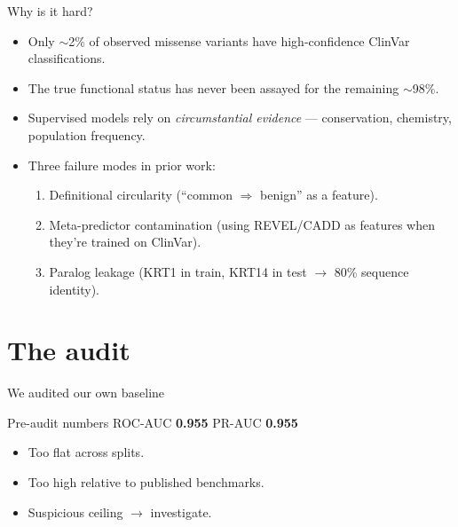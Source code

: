 \documentclass[aspectratio=169]{beamer}
\begin{document}
\begin{frame}{Why is it hard?}
  \begin{itemize}
    \item Only $\sim$2\% of observed missense variants have
          high-confidence ClinVar classifications.
    \item The true functional status has never been assayed for
          the remaining $\sim$98\%.
    \item Supervised models rely on \emph{circumstantial evidence}
          --- conservation, chemistry, population frequency.
    \item Three failure modes in prior work:
    \begin{enumerate}
      \item Definitional circularity (``common $\Rightarrow$ benign''
            as a feature).
      \item Meta-predictor contamination (using REVEL/CADD as
            features when they're trained on ClinVar).
      \item \alert{Paralog leakage} (KRT1 in train, KRT14 in test
            $\to$ 80\% sequence identity).
    \end{enumerate}
  \end{itemize}
\end{frame}


\section{The audit}

\begin{frame}{We audited our own baseline}
  \begin{block}{Pre-audit numbers}
    \centering
    \large ROC-AUC \textbf{0.955} \qquad PR-AUC \textbf{0.955}
  \end{block}

  \vspace{0.6em}
  \begin{itemize}
    \item Too flat across splits.
    \item Too high relative to published benchmarks.
    \item \alert{Suspicious ceiling} $\to$ investigate.
  \end{itemize}
\end{frame}
\end{document}

